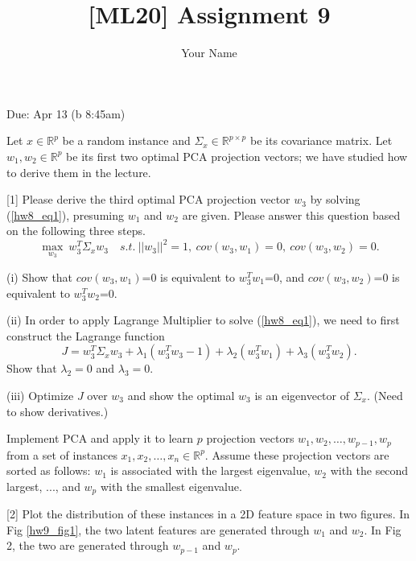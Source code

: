 \documentclass{llncs}
\title{[ML20] Assignment 9}
\author{Your Name}
\institute{}
\begin{document}
\maketitle 

\setlength\parindent{0pt} 
\setlength{\parskip}{10pt}

Due: Apr 13 (b 8:45am) 

Let $x \in \mathbb{R}^{p}$ be a random instance 
and $\Sigma_{x} \in \mathbb{R}^{p \times p}$ be 
its covariance matrix. 
Let $w_{1}, w_{2} \in \mathbb{R}^{p}$ be its first 
two optimal PCA projection vectors; we have studied 
how to derive them in the lecture. 

[1] Please derive the third optimal PCA projection 
vector $w_{3}$ by solving (\ref{hw8_eq1}), presuming 
$w_{1}$ and $w_{2}$ are given. Please answer this 
question based on the following three steps. 
\begin{equation}
\label{hw8_eq1}
\max_{w_{3}}\ w_{3}^{T} \Sigma_{x} w_{3} \quad 
s.t.\ ||w_{3}||^{2} = 1,\ cov(w_{3}, w_{1})=0,\ 
cov(w_{3}, w_{2})=0. 
\end{equation}

(i) Show that $cov(w_{3}, w_{1})$=0 is equivalent 
to $w_{3}^{T} w_{1}$=0, and $cov(w_{3}, w_{2})$=0 
is equivalent to $w_{3}^{T} w_{2}$=0. 

(ii) In order to apply Lagrange Multiplier to 
solve (\ref{hw8_eq1}), we need to first construct 
the Lagrange function
\begin{equation}
\label{hw8_eq2}
J = w_{3}^{T} \Sigma_{x} w_{3} 
+ \lambda_{1} (w_{3}^{T} w_{3} - 1)
+ \lambda_{2} (w_{3}^{T} w_{1}) 
+ \lambda_{3} (w_{3}^{T} w_{2}). 
\end{equation}
Show that $\lambda_{2} = 0$ and $\lambda_{3} = 0$. 

(iii) Optimize $J$ over $w_{3}$ and show the 
optimal $w_{3}$ is an eigenvector of $\Sigma_{x}$. 
(Need to show derivatives.) 
 
\newpage 

Implement PCA and apply it to learn 
$p$ projection vectors $w_{1}, w_{2}, \ldots, w_{p-1}, w_{p}$ from a set 
of instances $x_{1}, x_{2}, \ldots, x_{n} 
\in \mathbb{R}^{p}$. Assume these
projection vectors are sorted as follows: 
$w_{1}$ is associated with the largest eigenvalue, $w_{2}$ with the second 
largest, ..., and $w_{p}$ with the 
smallest eigenvalue. 

[2] Plot the distribution of these 
instances in a 2D feature space in 
two figures. 
In Fig \ref{hw9_fig1}, the two latent 
features are generated through $w_{1}$ 
and $w_{2}$. In Fig 2, the two are
generated through $w_{p-1}$ and $w_{p}$. 
\end{document}
